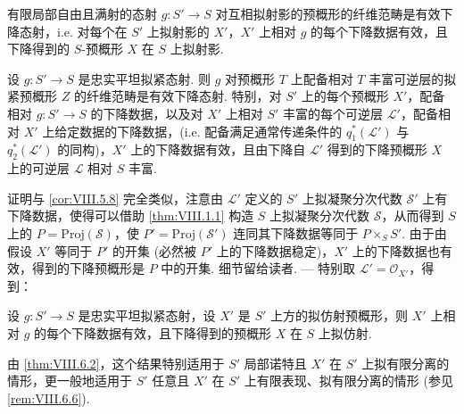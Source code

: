 \begin{corollary}\label{cor:VIII.7.7}
有限局部自由且满射的态射 $g \colon S' \to S$ 对互相拟射影的预概形的纤维范畴是有效下降态射，i.e. 对每个在 $S'$ 上拟射影的 $X'$，$X'$ 上相对 $g$ 的每个下降数据有效，且下降得到的 $S$-预概形 $X$ 在 $S$ 上拟射影.
\end{corollary}

\begin{proposition}\label{prop:VIII.7.8}
设 $g \colon S' \to S$ 是忠实平坦拟紧态射. 则 $g$ 对预概形 $T$ 上配备相对 $T$ 丰富可逆层的拟紧预概形 $Z$ 的纤维范畴是有效下降态射. 特别，对 $S'$ 上的每个预概形 $X'$，配备相对 $g \colon S' \to S$ 的下降数据，以及对 $X'$ 上相对 $S'$ 丰富的每个可逆层 $\mathcal{L}'$，配备相对 $X'$ 上给定数据的下降数据，(i.e. 配备满足通常传递条件的 $q_1^{*}(\mathcal{L}')$ 与 $q_2^{*}(\mathcal{L}')$ 的同构)，$X'$ 上的下降数据有效，且由下降自 $\mathcal{L}'$ 得到的下降预概形 $X$ 上的可逆层 $\mathcal{L}$ 相对 $S$ 丰富.
\end{proposition}

证明与 \ref{cor:VIII.5.8} 完全类似，注意由 $\mathcal{L}'$ 定义的 $S'$ 上拟凝聚分次代数 $\mathcal{S}'$ 上有下降数据，使得可以借助 \ref{thm:VIII.1.1} 构造 $S$ 上拟凝聚分次代数 $\mathcal{S}$，从而得到 $S$ 上的 $P = \mathrm{Proj}(\mathcal{S})$，使 $P' = \mathrm{Proj}(\mathcal{S}')$ 连同其下降数据等同于 $P \times_S S'$. 由于由假设 $X'$ 等同于 $P'$ 的开集 (必然被 $P'$ 上的下降数据稳定)，$X'$ 上的下降数据也有效，得到的下降预概形是 $P$ 中的开集. 细节留给读者. — 特别取 $\mathcal{L}' = \mathcal{O}_{X'}$，得到：

\begin{corollary}\label{cor:VIII.7.9}
设 $g \colon S' \to S$ 是忠实平坦拟紧态射，设 $X'$ 是 $S'$ 上方的拟仿射预概形，则 $X'$ 上相对 $g$ 的每个下降数据有效，且下降得到的预概形 $X$ 在 $S$ 上拟仿射.
\end{corollary}

由 \ref{thm:VIII.6.2}，这个结果特别适用于 $S'$ 局部诺特且 $X'$ 在 $S'$ 上拟有限分离的情形，更一般地适用于 $S'$ 任意且 $X'$ 在 $S'$ 上有限表现、拟有限分离的情形 (参见 \ref{rem:VIII.6.6}).

